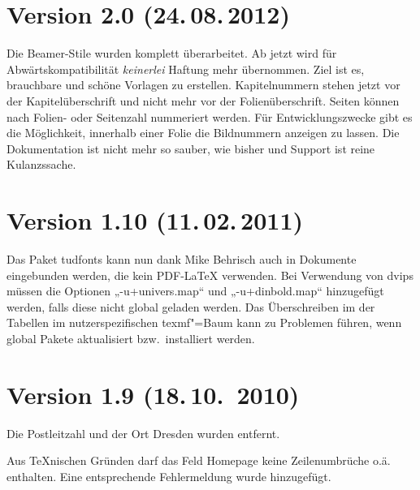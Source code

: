 \documentclass[a0paper,noDIN,MathematikA0]{tudmathposter}
\begin{document}
\section{Version 2.0 (24.\,08.\,2012)}
Die Beamer-Stile wurden komplett überarbeitet. Ab jetzt wird für
Abwärtskompatibilität \emph{keinerlei} Haftung mehr übernommen. Ziel
ist es, brauchbare und schöne Vorlagen zu erstellen. Kapitelnummern
stehen jetzt vor der Kapitelüberschrift und nicht mehr vor der
Folienüberschrift. Seiten können nach Folien- oder Seitenzahl
nummeriert werden. Für Entwicklungszwecke gibt es die Möglichkeit,
innerhalb einer Folie die Bildnummern anzeigen zu lassen. Die
Dokumentation ist nicht mehr so sauber, wie bisher und Support ist
reine Kulanzssache.

\section{Version 1.10 (11.\,02.\,2011)}
Das Paket tudfonts kann nun dank Mike Behrisch auch in Dokumente
eingebunden werden, die kein
PDF-LaTeX verwenden. Bei Verwendung von dvips müssen die Optionen
„-u+univers.map“ und „-u+dinbold.map“ hinzugefügt werden, falls diese
nicht global geladen werden. Das Überschreiben im der Tabellen im
nutzerspezifischen texmf"=Baum kann zu Problemen führen, wenn global
Pakete aktualisiert bzw.\ installiert werden.
\section{Version 1.9 (18.\,10.~2010)}
Die Postleitzahl und der Ort Dresden wurden entfernt.

Aus \TeX nischen Gründen darf das Feld Homepage keine Zeilenumbrüche o.ä. enthalten. Eine entsprechende Fehlermeldung wurde hinzugefügt.
\end{document}
